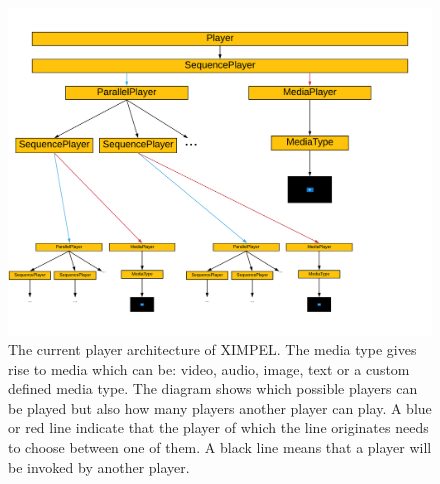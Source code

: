 \begin{figure}
\centering
\includegraphics[width=1.35\textwidth, center]{ximpel_player_architecture.pdf} %
\caption{The current player architecture of XIMPEL. The media type gives rise to media which can be: video, audio, image, text or a custom defined media type. The diagram shows which possible players can be played but also how many players another player can play. A blue or red line indicate that the player of which the line originates needs to choose between one of them. A black line means that a player will be invoked by another player.}
\label{fig:architecture}
\end{figure}


